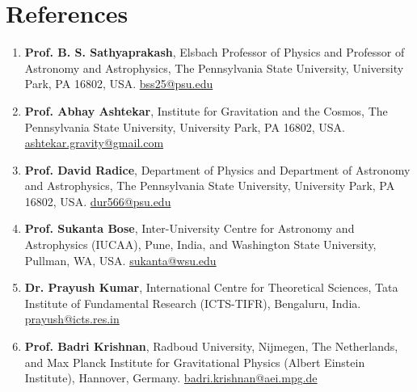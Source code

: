 %

\section{References}

\begin{enumerate}
\item \textbf{Prof. B. S. Sathyaprakash}, Elsbach Professor of Physics and Professor of Astronomy and Astrophysics, The Pennsylvania State University, University Park, PA 16802, USA. \href{mailto:bss25@psu.edu}{bss25@psu.edu}
\item \textbf{Prof. Abhay Ashtekar}, Institute for Gravitation and the Cosmos, The Pennsylvania State University, University Park, PA 16802, USA. \href{mailto:ashtekar.gravity@gmail.com}{ashtekar.gravity@gmail.com}
\item \textbf{Prof. David Radice}, Department of Physics and Department of Astronomy and Astrophysics, The Pennsylvania State University, University Park, PA 16802, USA. \href{mailto:dur566@psu.edu}{dur566@psu.edu}
\item \textbf{Prof. Sukanta Bose}, Inter-University Centre for Astronomy and Astrophysics (IUCAA), Pune, India, and Washington State University, Pullman, WA, USA. \href{mailto:sukanta@wsu.edu}{sukanta@wsu.edu}
\item \textbf{Dr. Prayush Kumar}, International Centre for Theoretical Sciences, Tata Institute of Fundamental Research (ICTS-TIFR), Bengaluru, India. \href{mailto:prayush@icts.res.in}{prayush@icts.res.in}
\item \textbf{Prof. Badri Krishnan}, Radboud University, Nijmegen, The Netherlands, and Max Planck Institute for Gravitational Physics (Albert Einstein Institute), Hannover, Germany. \href{mailto:badri.krishnan@aei.mpg.de}{badri.krishnan@aei.mpg.de}
\end{enumerate}

